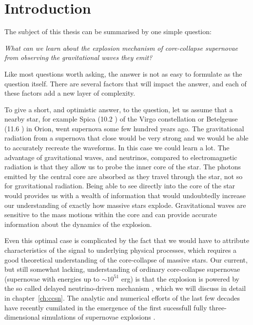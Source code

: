 \chapter{Introduction}
The subject of this thesis can be summarised by one simple question:
\begin{displayquote}
\textit{What can we learn about the explosion mechanism of core-collapse supernovae
from observing the gravitational waves they emit?}
\end{displayquote}
Like most questions worth asking, the answer is not as easy to formulate 
as the question itself. There are several factors that will impact the 
answer, and each of these factors add a new layer of complexity.

To give a short, and optimistic answer, to the question, let us assume
that a nearby star, for example Spica (10.2 \msun) of the Virgo constellation 
or Betelgeuse (11.6 \msun) in Orion, went supernova some few hundred years ago.
The gravitational radiation from a supernova that close would be very strong and
we would be able to accurately recreate the waveforms. In this case we could learn a lot.
The advantage of gravitational waves, and neutrinos, compared to electromagnetic radiation
is that they allow us to probe the inner core of the star. The photons emitted by the
central core are absorbed as they travel through the star, not so for gravitational radiation.
Being able to see directly into the core of the star would provides us with a wealth of information
that would undoubtedly increase our understanding of exactly how massive stars explode. Gravitational
waves are sensitive to the mass motions within the core and can provide accurate information about
the dynamics of the explosion.

Even this optimal case is complicated by the fact that we would have to 
attribute characteristics of the signal to underlying physical processes, which
requires a good theoretical understanding of the core-collapse of massive stars.
Our current, but still somewhat lacking, understanding of ordinary core-collapse
supernovae (supernovae with energies up to $\sim 10^{51}$ erg) is that the explosion
is powered by the so called delayed neutrino-driven mechanism \citep{wilson_85}, 
which we will discuss in detail in chapter~\ref{ch:ccsn}. The analytic and numerical efforts
of the last few decades have recently cumilated in the emergence of the first sucessfull
fully three-dimensional simulations of supernovae explosions \citep{melson_15a,melson_15b,lentz_15, suma_models}.

